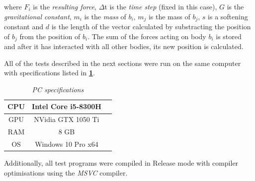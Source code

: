\documentclass[12pt, a4paper]{article}
\begin{document}
    where $F_i$ is the \textit{resulting force}, $\Delta$t is the \textit{time step} (fixed in this case), $G$ is the \textit{gravitational constant}, $m_i$ is the \textit{mass} of $b_i$,  $m_j$ is the mass of $b_j$, $s$ is a softening constant and $d$ is the length of the vector calculated by substracting the position of $b_j$ from the position of $b_i$. The sum of the forces acting on body $b_i$ is stored and after it has interacted with all other bodies, its new position is calculated.

    All of the tests described in the next sections were run on the same computer with specifications listed in \textbf{\cref{table:specs}}. 

    \begin{table}[!h]
        \centering
        \caption{\small{\textit{PC specifications}}}
        \vspace*{-7mm} 
        \label{table:specs}
        \begin{tabular}{ccc}\\\toprule  
            \hline
            {\cellcolor{lightgray}}CPU & {\cellcolor{white}}Intel Core i5-8300H \\ 
            \hline
            {\cellcolor{lightgray}}GPU & {\cellcolor{white}}NVidia GTX 1050 Ti  \\ 
            \hline
            {\cellcolor{lightgray}}RAM & {\cellcolor{white}}8 GB                \\ 
            \hline
            {\cellcolor{lightgray}}OS  & {\cellcolor{white}}Windows 10 Pro x64  \\
            \hline
        \end{tabular}       
    \end{table} 

    Additionally, all test programs were compiled in Release mode with compiler optimisations using the \textit{MSVC} compiler.
\end{document}
